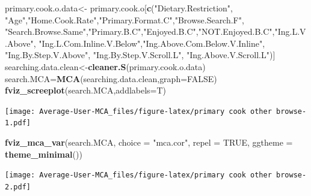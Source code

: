 \documentclass[
]{article}
\newenvironment{Shaded}{\begin{snugshade}}{\end{snugshade}}
\newcommand{\DataTypeTok}[1]{\textcolor[rgb]{0.13,0.29,0.53}{#1}}
\newcommand{\KeywordTok}[1]{\textcolor[rgb]{0.13,0.29,0.53}{\textbf{#1}}}
\newcommand{\NormalTok}[1]{#1}
\newcommand{\OtherTok}[1]{\textcolor[rgb]{0.56,0.35,0.01}{#1}}
\newcommand{\StringTok}[1]{\textcolor[rgb]{0.31,0.60,0.02}{#1}}
\begin{document}
\begin{Shaded}
\begin{Highlighting}[]
\NormalTok{primary.cook.o.data<-}\StringTok{ }\NormalTok{primary.cook.o[}\KeywordTok{c}\NormalTok{(}\StringTok{"Dietary.Restriction"}\NormalTok{, }\StringTok{"Age"}\NormalTok{,}\StringTok{"Home.Cook.Rate"}\NormalTok{,}\StringTok{"Primary.Format.C"}\NormalTok{,}\StringTok{"Browse.Search.F"}\NormalTok{,}
            \StringTok{"Search.Browse.Same"}\NormalTok{,}\StringTok{"Primary.B.C"}\NormalTok{,}\StringTok{"Enjoyed.B.C"}\NormalTok{,}\StringTok{"NOT.Enjoyed.B.C"}\NormalTok{,}\StringTok{"Ing.L.V.Above"}\NormalTok{,}
            \StringTok{"Ing.L.Com.Inline.V.Below"}\NormalTok{,}\StringTok{"Ing.Above.Com.Below.V.Inline"}\NormalTok{,  }\StringTok{"Ing.By.Step.V.Above"}\NormalTok{,  }\StringTok{"Ing.By.Step.V.Scroll.L"}\NormalTok{,}
            \StringTok{"Ing.Above.V.Scroll.L"}\NormalTok{)]}
\NormalTok{searching.data.clean<-}\KeywordTok{cleaner.S}\NormalTok{(primary.cook.o.data)}
\NormalTok{search.MCA=}\KeywordTok{MCA}\NormalTok{(searching.data.clean,}\DataTypeTok{graph=}\OtherTok{FALSE}\NormalTok{)}
\KeywordTok{fviz_screeplot}\NormalTok{(search.MCA,}\DataTypeTok{addlabels=}\NormalTok{T)}
\end{Highlighting}
\end{Shaded}

\texttt{[image: Average-User-MCA\_files/figure-latex/primary cook other browse-1.pdf]}

\begin{Shaded}
\begin{Highlighting}[]
\KeywordTok{fviz_mca_var}\NormalTok{(search.MCA, }\DataTypeTok{choice =} \StringTok{"mca.cor"}\NormalTok{, }\DataTypeTok{repel =} \OtherTok{TRUE}\NormalTok{,}
             \DataTypeTok{ggtheme =} \KeywordTok{theme_minimal}\NormalTok{())}
\end{Highlighting}
\end{Shaded}

\texttt{[image: Average-User-MCA\_files/figure-latex/primary cook other browse-2.pdf]}

\begin{Shaded}
\end{Shaded}
\end{document}
